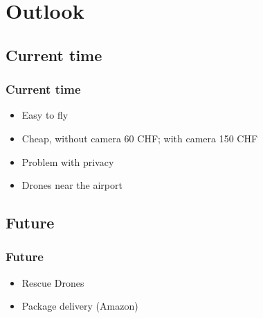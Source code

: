 \section{Outlook}

\begin{frame}
\tableofcontents[
    currentsection, 
    sectionstyle=show/shaded, 
    subsectionstyle=hide
]
\end{frame}


\subsection*{Current time}
\begin{frame}
\frametitle{Current time}

  \begin{itemize}
    \item Easy to fly
    \item Cheap, without camera 60 CHF; with camera 150 CHF 
    \item Problem with privacy    
    \item Drones near the airport
  \end{itemize}
\end{frame}


\subsection*{Future}
\begin{frame}
\frametitle{Future}

  \begin{itemize}
    \item Rescue Drones   
    \item Package delivery (Amazon)
  \end{itemize}
\end{frame}



